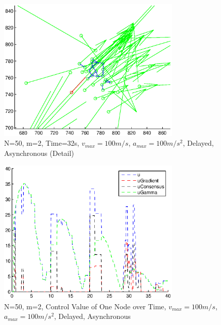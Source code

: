 \documentclass[10pt, conference]{IEEEtran}
\begin{document}
\begin{figure}[!p]
  \begin{center}
    \includegraphics[width=3.45in]{n50m2vmax100amax10000t32delayAsyncZoom}
  \end{center}

  \caption{\small N=50, m=2, Time=32s, $v_{max}=100m/s$, $a_{max}=100m/s^2$, Delayed, Asynchronous (Detail)}
  \label{fig:n50m2vmax100amax10000t32delayAsyncZoom}
\end{figure}

\begin{figure}[!p]
  \begin{center}
    \includegraphics[width=3.45in]{n50m2vmax100amax10000delayAsyncControl}
  \end{center}

  \caption{\small N=50, m=2, Control Value of One Node over Time, $v_{max}=100m/s$, $a_{max}=100m/s^2$, Delayed, Asynchronous}
  \label{fig:n50m2vmax100amax10000delayAsyncControl}
\end{figure}
\end{document}
